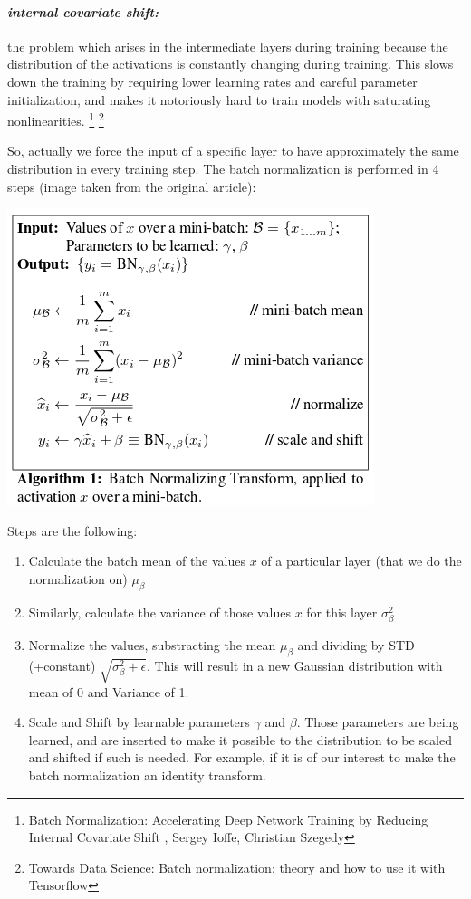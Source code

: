 \documentclass[a4paper]{iacas}
\begin{document}
\paragraph{\textit{internal covariate shift:}}
the problem which arises in the intermediate layers during training because the distribution of the activations is constantly changing during training. This slows down the training by requiring lower learning rates and careful parameter initialization, and makes it notoriously hard to train models with saturating nonlinearities. \footnote{Batch Normalization: Accelerating Deep Network Training by Reducing Internal Covariate Shift , Sergey Ioffe, Christian Szegedy} \footnote{Towards Data Science: Batch normalization: theory and how to use it with Tensorflow}
\newline

So, actually we force the input of a specific layer to have approximately the same distribution in every training step. The batch normalization is performed in 4 steps (image taken from the original article):

\vskip 0.1in
\includegraphics[scale=0.6]{imgs/batch_norm.PNG}
\vskip 0.1in

Steps are the following:
\begin{enumerate}
\item Calculate the batch mean of the values $x$ of a particular layer (that we do the normalization on) $\mu_{\beta}$
\item Similarly, calculate the variance of those values $x$ for this layer $\sigma_{\beta}^{2}$
\item Normalize the values, substracting the mean $\mu_{\beta}$ and dividing by STD (+constant) $\sqrt{\sigma_{\beta}^{2} + \epsilon}$. This will result in a new Gaussian distribution with mean of 0 and Variance of 1. 
\item Scale and Shift by learnable parameters $\gamma$ and $\beta$. Those parameters are being learned, and are inserted to make it possible to the distribution to be scaled and shifted if such is needed. For example, if it is of our interest to make the batch normalization an identity transform. 
\end{enumerate}

\newpage
\end{document}
